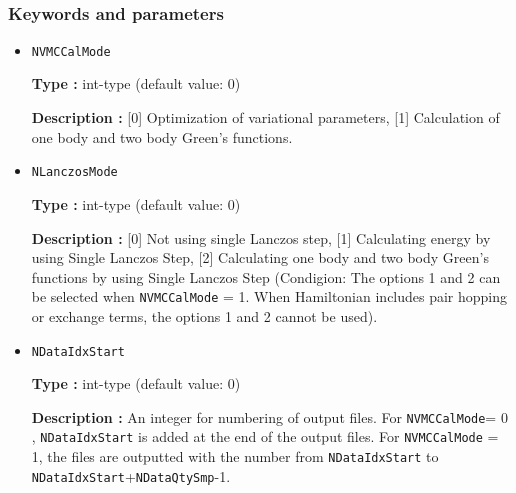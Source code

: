 ~\subsubsection{Keywords and parameters}
 \begin{itemize}





 
 
 \item  \verb|NVMCCalMode|

 {\bf Type :} int-type (default value: 0)

{\bf Description :} [0] Optimization of variational parameters, [1] Calculation of one body and two body Green's functions.

 \item  \verb|NLanczosMode|

 {\bf Type :} int-type (default value: 0)

{\bf Description :} [0] Not using single Lanczos step, [1] Calculating energy by using Single Lanczos Step, [2] Calculating one body and two body Green's functions by using Single Lanczos Step (Condigion: The options 1 and 2 can be selected when \verb|NVMCCalMode| = 1. When Hamiltonian includes  pair hopping or exchange terms, the options 1 and 2 cannot be used).
 
 \item  \verb|NDataIdxStart|

 {\bf Type :} int-type (default value: 0)

{\bf Description :} An integer for numbering of output files. For \verb|NVMCCalMode|= 0 , \verb|NDataIdxStart| is added at the end of the output files. For \verb|NVMCCalMode| = 1,  the files are outputted with the number from \verb|NDataIdxStart| to  \verb|NDataIdxStart|+\verb|NDataQtySmp|-1.
   

\end{itemize}
